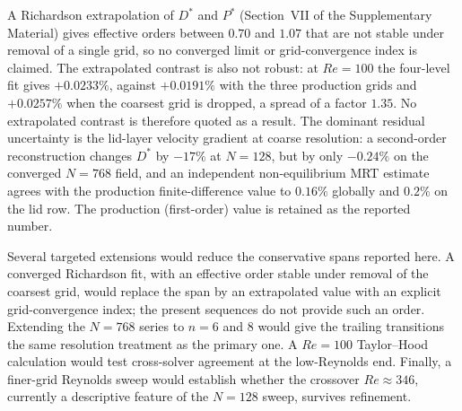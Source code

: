A Richardson extrapolation of $D^*$ and $P^*$ (Section~VII of the Supplementary Material) gives effective orders between $0.70$ and $1.07$ that are not stable under removal of a single grid, so no converged limit or grid-convergence index is claimed. The extrapolated contrast is also not robust: at $Re=100$ the four-level fit gives $+0.0233\%$, against $+0.0191\%$ with the three production grids and $+0.0257\%$ when the coarsest grid is dropped, a spread of a factor $1.35$. No extrapolated contrast is therefore quoted as a result. The dominant residual uncertainty is the lid-layer velocity gradient at coarse resolution: a second-order reconstruction changes $D^*$ by $-17\%$ at $N=128$, but by only $-0.24\%$ on the converged $N=768$ field, and an independent non-equilibrium MRT estimate agrees with the production finite-difference value to $0.16\%$ globally and $0.2\%$ on the lid row. The production (first-order) value is retained as the reported number.

Several targeted extensions would reduce the conservative spans reported here. A converged Richardson fit, with an effective order stable under removal of the coarsest grid, would replace the span by an extrapolated value with an explicit grid-convergence index; the present sequences do not provide such an order. Extending the $N=768$ series to $n=6$ and $8$ would give the trailing transitions the same resolution treatment as the primary one. A $Re=100$ Taylor--Hood calculation would test cross-solver agreement at the low-Reynolds end. Finally, a finer-grid Reynolds sweep would establish whether the crossover $Re\approx346$, currently a descriptive feature of the $N=128$ sweep, survives refinement.
